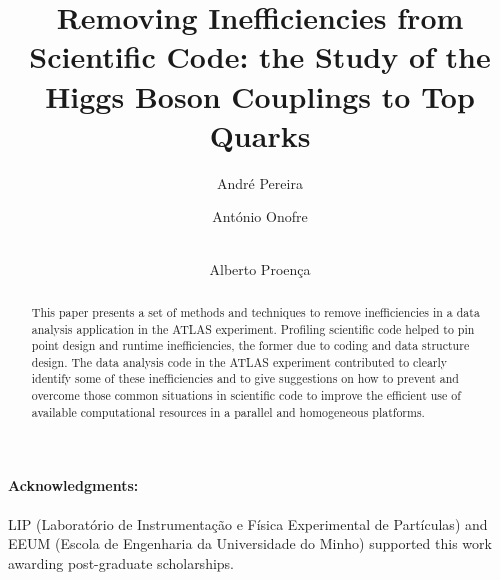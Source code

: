 \documentclass[runningheads,a4paper]{llncs}
\begin{document}
\title{Removing Inefficiencies from Scientific Code: the Study of the Higgs Boson Couplings to Top Quarks}




%
%
\author{André Pereira \and António Onofre  \and \\ Alberto Proença}
%



\maketitle              %

\begin{abstract}

This paper presents a set of methods and techniques to remove inefficiencies in a data analysis application in the ATLAS experiment. Profiling scientific code helped to pin point design and runtime inefficiencies, the former due to coding and data structure design. The data analysis code in the ATLAS experiment contributed to clearly identify some of these inefficiencies and to give suggestions on how to prevent and overcome those common situations in scientific code to improve the efficient use of available computational resources in a parallel and homogeneous platforms.

\end{abstract}
%








\paragraph{Acknowledgments:}

LIP (Laboratório de Instrumentação e Física Experimental de Partículas) and EEUM (Escola de Engenharia da Universidade do Minho) supported this work awarding post-graduate scholarships.



\end{document}
